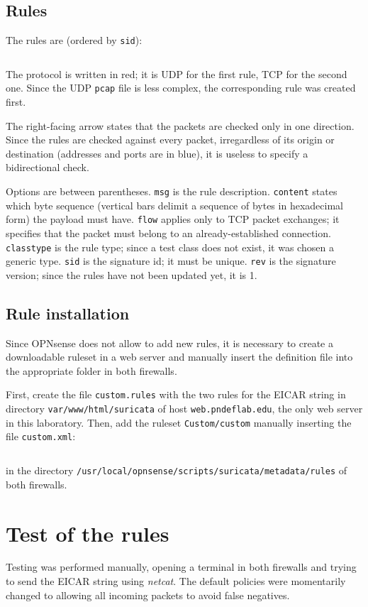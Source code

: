 \documentclass[draft]{homework}
\newcommand{\opn}{OPNsense\xspace}
\begin{document}
    \subsection{Rules}
    The rules are (ordered by \texttt{sid}):
    \inputminted[breaklines]{suricata.py:SuriLexer -x}{../pnd-lab7-es1/web/var/www/html/suricata/custom.rules}
    
    The protocol is written in red; it is UDP for the first rule, TCP for the second one.
    Since the UDP \texttt{pcap} file is less complex, the corresponding rule was created first.
    
    The right-facing arrow states that the packets are checked only in one direction.
    Since the rules are checked against every packet, irregardless of its origin or destination (addresses and ports are in blue), it is useless to specify a bidirectional check.
    
    Options are between parentheses.
    \texttt{msg} is the rule description.
    \texttt{content} states which byte sequence (vertical bars delimit a sequence of bytes in hexadecimal form) the payload must have.
    \texttt{flow} applies only to TCP packet exchanges; it specifies that the packet must belong to an already-established connection.
    \texttt{classtype} is the rule type; since a test class does not exist, it was chosen a generic type.
    \texttt{sid} is the signature id; it must be unique.
    \texttt{rev} is the signature version; since the rules have not been updated yet, it is 1.
    
    \subsection{Rule installation}
    Since \opn does not allow to add new rules, it is necessary to create a downloadable ruleset in a web server and manually insert the definition file into the appropriate folder in both firewalls.
    
    First, create the file \texttt{custom.rules} with the two rules for the EICAR string in directory \texttt{var/www/html/suricata} of host \texttt{web.pndeflab.edu}, the only web server in this laboratory.
    Then, add the ruleset \texttt{Custom/custom} manually inserting the file \texttt{custom.xml}:
    \inputminted{xml}{files/custom.xml}
    \noindent in the directory \texttt{/usr/local/opnsense/scripts/suricata/metadata/rules} of both firewalls.
    
    
    \section{Test of the rules}
    Testing was performed manually, opening a terminal in both firewalls and trying to send the EICAR string using \textit{netcat}.
    The default policies were momentarily changed to allowing all incoming packets to avoid false negatives.
    
\end{document}
